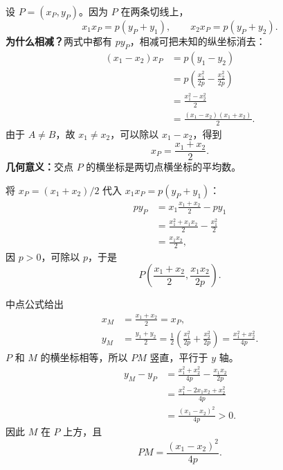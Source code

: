 \begin{proofbox}
\begin{description}[style=nextline, leftmargin=2.8em, labelsep=0.5em, itemsep=0.55em]
        \item[\textbf{第二步（两式相减，求交点横坐标）：}]
        设 $P=(x_P,y_P)$。因为 $P$ 在两条切线上，
        \[
            x_1x_P=p(y_P+y_1),\qquad
            x_2x_P=p(y_P+y_2).
        \]
        \textbf{为什么相减？}两式中都有 $py_P$，相减可把未知的纵坐标消去：
        \[
        \begin{aligned}
            (x_1-x_2)x_P
            &=p(y_1-y_2)\\
            &=p\left(\frac{x_1^2}{2p}-\frac{x_2^2}{2p}\right)\\
            &=\frac{x_1^2-x_2^2}{2}\\
            &=\frac{(x_1-x_2)(x_1+x_2)}2.
        \end{aligned}
        \]
        由于 $A\ne B$，故 $x_1\ne x_2$，可以除以 $x_1-x_2$，得到
        \[
            \boxed{x_P=\frac{x_1+x_2}{2}}.
        \]
        \textbf{几何意义：}交点 $P$ 的横坐标是两切点横坐标的平均数。

        \item[\textbf{第三步（回代，求交点纵坐标）：}]
        将 $x_P=(x_1+x_2)/2$ 代入 $x_1x_P=p(y_P+y_1)$：
        \[
        \begin{aligned}
            py_P
            &=x_1\frac{x_1+x_2}{2}-py_1\\
            &=\frac{x_1^2+x_1x_2}{2}-\frac{x_1^2}{2}\\
            &=\frac{x_1x_2}{2},
        \end{aligned}
        \]
        因 $p>0$，可除以 $p$，于是
        \[
            \boxed{P\left(\frac{x_1+x_2}{2},\frac{x_1x_2}{2p}\right)}.
        \]

        \item[\textbf{第四步（找中点与竖直中线）：}]
        中点公式给出
        \[
        \begin{aligned}
            x_M&=\frac{x_1+x_2}{2}=x_P,\\
            y_M&=\frac{y_1+y_2}{2}
            =\frac12\left(\frac{x_1^2}{2p}+\frac{x_2^2}{2p}\right)
            =\frac{x_1^2+x_2^2}{4p}.
        \end{aligned}
        \]
        $P$ 和 $M$ 的横坐标相等，所以 $PM$ 竖直，平行于 $y$ 轴。
        \[
        \begin{aligned}
            y_M-y_P
            &=\frac{x_1^2+x_2^2}{4p}-\frac{x_1x_2}{2p}\\
            &=\frac{x_1^2-2x_1x_2+x_2^2}{4p}\\
            &=\frac{(x_1-x_2)^2}{4p}>0.
        \end{aligned}
        \]
        因此 $M$ 在 $P$ 上方，且
        \[
            \boxed{PM=\frac{(x_1-x_2)^2}{4p}}.
        \]


\end{description}
\end{proofbox}
